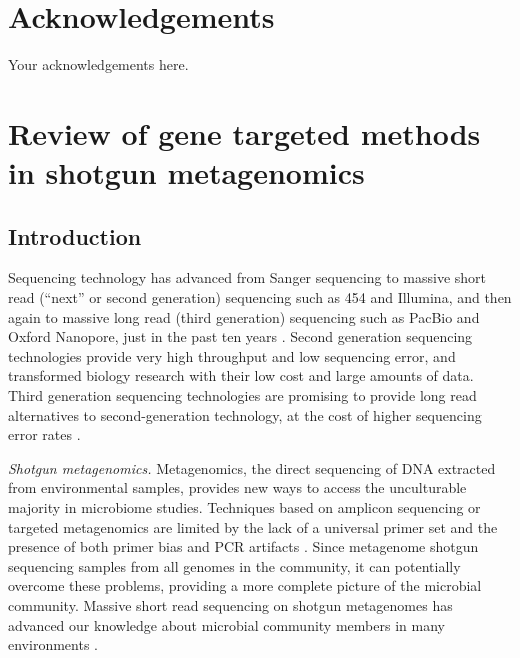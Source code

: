 \documentclass[]{msu-thesis}
\begin{document}
\makecopyrightpage

%
%
\clearpage
\chapter*{Acknowledgements}
\DoubleSpacing %
Your acknowledgements here.
%
\clearpage
\SingleSpacing
\tableofcontents* %
\clearpage
\listoftables %
\clearpage
\listoffigures %
%
%
\mainmatter
%

\chapter{Review of gene targeted methods in shotgun metagenomics}

\section{Introduction}

Sequencing technology has advanced from Sanger sequencing to massive
short read (``next'' or second generation) sequencing such as 454 and
Illumina, and then again to massive long read (third generation) sequencing such
as PacBio and Oxford Nanopore, just in the past ten years
\cite{mardis_impact_2008,pettersson_generations_2009}. Second
generation sequencing technologies provide very high throughput and
low sequencing error, and transformed biology
research with their low cost and large amounts of data. Third generation sequencing technologies are
promising to provide long read alternatives to second-generation technology, at the cost of higher
sequencing error rates \cite{rhoads_pacbio_2015}.

\textit{Shotgun metagenomics. } Metagenomics, the direct sequencing of
DNA extracted from environmental samples, provides new ways to access the
unculturable majority in microbiome studies.  Techniques based on amplicon sequencing or targeted
metagenomics are limited by the lack of a universal primer set and the presence of both primer bias and
PCR artifacts
\cite{frank_critical_2008,haas_chimeric_2011,guo_microbial_2015}. Since
metagenome shotgun sequencing samples from all
genomes in the community, it can potentially overcome these problems,
providing a more complete picture of the microbial community. Massive short read
sequencing on shotgun metagenomes has advanced our knowledge about
microbial community members in many environments
\cite{howe_tackling_2014,sunagawa_ocean_2015}.
\end{document}
